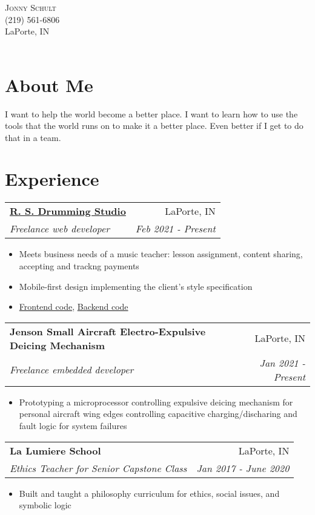 \documentclass[letterpaper,11pt]{article}
\makeatletter
\newcommand{\resumeItem}[1]{
  \item\small{#1}
}
\newcommand{\resumeHeading}[4]{
    \begin{tabular*}{0.99\textwidth}[t]{l@{\extracolsep{\fill}}r}
      \textbf{#1} & #2 \\
      \textit{\small#3} & \textit{\small #4} \\
    \end{tabular*}\vspace{-5pt}
}
\newcommand{\resumeItemListStart}{\begin{itemize}}
\newcommand{\resumeItemListEnd}{\end{itemize}\vspace{-5pt}}
\makeatother
\begin{document}
\par{
    \centering
		{
            \huge \textsc{Jonny} \textsc{Schult} \\
            \normalsize (219) 561-6806 \\ LaPorte, IN \\
            \Large \color{RoyalBlue}\href{https://github.com/jonnyschult}{}
            \Large \href{mailto:jonathon.schult@gmail.com}{}
            \Large \color{RoyalBlue}\href{http://www.linkedin.com/in/jonny-schult/}{}\\
    } \bigskip \par
}

\section{About Me}
I want to help the world become a better place. I want to learn how to use the tools that the world runs on to make it a better place. Even better if I get to do that in a team.

\section{Experience}
  \resumeHeading{\color{RoyalBlue}\href{https://www.rsdrum.com}{R. S. Drumming Studio}}{LaPorte, IN}{Freelance web developer}{Feb 2021 - Present}
      \resumeItemListStart
        \resumeItem{Meets business needs of a music teacher: lesson assignment, content sharing, accepting and trackng payments}
        \resumeItem{Mobile-first design implementing the client's style specification}
        \resumeItem{\color{RoyalBlue}\href{https://github.com/jonnyschult/rsdrumFrontend}{Frontend code}, \color{RoyalBlue}\href{https://github.com/jonnyschult/rsdrumBackend}{Backend code}}
      \resumeItemListEnd

  \resumeHeading{Jenson Small Aircraft Electro-Expulsive Deicing Mechanism}{LaPorte, IN}{Freelance embedded developer}{Jan 2021 - Present}
      \resumeItemListStart
        \resumeItem{Prototyping a microprocessor controlling expulsive deicing mechanism for personal aircraft wing edges controlling capacitive charging/discharing and fault logic for system failures}
      \resumeItemListEnd

  \resumeHeading{La Lumiere School}{LaPorte, IN}{Ethics Teacher for Senior Capstone Class}{Jan 2017 - June 2020}
      \resumeItemListStart
        \resumeItem{Built and taught a philosophy curriculum for ethics, social issues, and symbolic logic}
      \resumeItemListEnd
\end{document}
